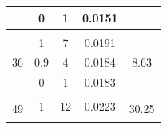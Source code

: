\begin{table}[]
\begin{tabular}{ccccc}
\multicolumn{1}{|c|}{}                         & \multicolumn{1}{c|}{0}                  & \multicolumn{1}{c|}{1}                                                                                    & \multicolumn{1}{c|}{0.0151}                                                             & \multicolumn{1}{c|}{}                                                                    \\ \hline
\multicolumn{1}{l}{}                           &                                         &                                                                                                           &                                                                                         & \multicolumn{1}{l}{}                                                                     \\ \hline
\multicolumn{1}{|c|}{\multirow{3}{*}{36}}      & \multicolumn{1}{c|}{1}                  & \multicolumn{1}{c|}{7}                                                                                    & \multicolumn{1}{c|}{0.0191}                                                             & \multicolumn{1}{c|}{\multirow{3}{*}{8.63}}                                               \\ \cline{2-4}
\multicolumn{1}{|c|}{}                         & \multicolumn{1}{c|}{0.9}                & \multicolumn{1}{c|}{4}                                                                                    & \multicolumn{1}{c|}{0.0184}                                                             & \multicolumn{1}{c|}{}                                                                    \\ \cline{2-4}
\multicolumn{1}{|c|}{}                         & \multicolumn{1}{c|}{0}                  & \multicolumn{1}{c|}{1}                                                                                    & \multicolumn{1}{c|}{0.0183}                                                             & \multicolumn{1}{c|}{}                                                                    \\ \hline
\multicolumn{1}{l}{}                           & \multicolumn{1}{l}{}                    & \multicolumn{1}{l}{}                                                                                      & \multicolumn{1}{l}{}                                                                    & \multicolumn{1}{l}{}                                                                     \\ \hline
\multicolumn{1}{|c|}{\multirow{3}{*}{49}}      & \multicolumn{1}{c|}{1}                  & \multicolumn{1}{c|}{12}                                                                                   & \multicolumn{1}{c|}{0.0223}                                                             & \multicolumn{1}{c|}{\multirow{3}{*}{30.25}}                                              \\ \cline{2-4}

\end{tabular}
\end{table}
